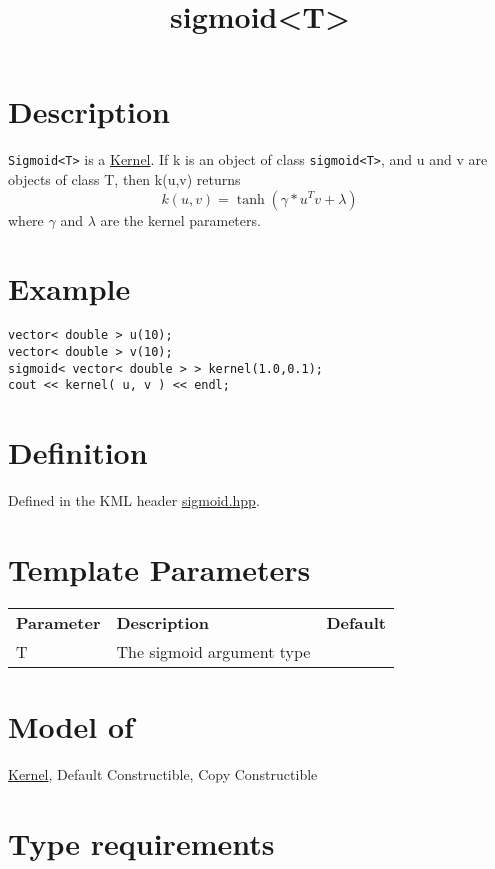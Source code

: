 \documentclass{article}
\begin{document}
\title{sigmoid<T>}
\maketitle

\section*{Description}

\texttt{Sigmoid<T>} is a \href{research/kml/documentation/kernel.html}{Kernel}. If k is an object of class \texttt{sigmoid<T>}, and u and v are objects of class T, then k(u,v) returns
%
$$k(u,v) = \tanh( \gamma * u^T v + \lambda)$$
%
where $\gamma$ and $\lambda$ are the kernel parameters. 


\section*{Example}


\highlightcpp{}
\begin{verbatim}
vector< double > u(10);
vector< double > v(10);
sigmoid< vector< double > > kernel(1.0,0.1);
cout << kernel( u, v ) << endl;
\end{verbatim}


\section*{Definition}

Defined in the KML header \href{sigmoid.hpp}{sigmoid.hpp}.


\section*{Template Parameters}

\begin{tabular}{lll}
\textbf{Parameter} & \textbf{Description} & \textbf{Default} \\ 
T & The sigmoid argument type \\ 
\end{tabular}


\section*{Model of}

\href{research/kml/documentation/kernel.html}{Kernel},
Default Constructible, Copy Constructible


\section*{Type requirements}
\end{document}
